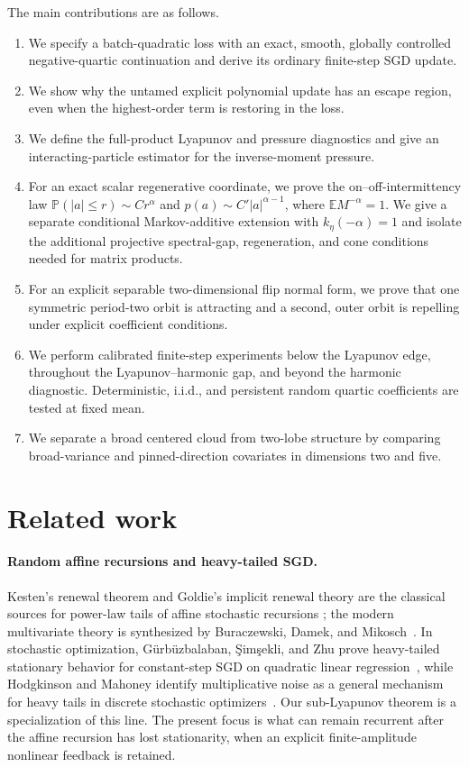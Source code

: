 \documentclass[11pt]{article}
\theoremstyle{definition}
\newcommand{\E}{\mathbb E}
\newcommand{\Pp}{\mathbb P}
\begin{document}
The main contributions are as follows.
\begin{enumerate}[label=\arabic*.,leftmargin=2em]
  \item We specify a batch-quadratic loss with an exact, smooth,
  globally controlled negative-quartic continuation and derive its ordinary
  finite-step SGD update.
  \item We show why the untamed explicit polynomial update has an escape
  region, even when the highest-order term is restoring in the loss.
  \item We define the full-product Lyapunov and pressure diagnostics and give
  an interacting-particle estimator for the inverse-moment pressure.
  \item For an exact scalar regenerative coordinate, we prove the
  on--off-intermittency law
  $\Pp(|a|\leq r)\sim C r^\alpha$ and
  $p(a)\sim C'|a|^{\alpha-1}$, where
  $\E M^{-\alpha}=1$.  We give a separate conditional Markov-additive
  extension with $k_\eta(-\alpha)=1$ and isolate the additional projective
  spectral-gap, regeneration, and cone conditions needed for matrix products.
  \item For an explicit separable two-dimensional flip normal form, we prove
  that one symmetric period-two orbit is attracting and a second, outer orbit
  is repelling under explicit coefficient conditions.
  \item We perform calibrated finite-step experiments below the Lyapunov edge,
  throughout the Lyapunov--harmonic gap, and beyond the harmonic diagnostic.
  Deterministic, i.i.d., and persistent random quartic coefficients are tested
  at fixed mean.
  \item We separate a broad centered cloud from two-lobe structure by comparing
  broad-variance and pinned-direction covariates in dimensions two and five.
\end{enumerate}

\section{Related work}

\paragraph{Random affine recursions and heavy-tailed SGD.}
Kesten's renewal theorem and Goldie's implicit renewal theory are the classical
sources for power-law tails of affine stochastic recursions
\cite{Kesten1973,Goldie1991}; the modern multivariate theory is synthesized by
Buraczewski, Damek, and Mikosch~\cite{BuraczewskiDamekMikosch2016}.  In
stochastic optimization, G\"urb\"uzbalaban, \c{S}im\c{s}ekli, and Zhu prove
heavy-tailed stationary behavior for constant-step SGD on quadratic linear
regression~\cite{GurbuzbalabanSimsekliZhu2021}, while Hodgkinson and Mahoney
identify multiplicative noise as a general mechanism for heavy tails in
discrete stochastic optimizers~\cite{HodgkinsonMahoney2021}.  Our
sub-Lyapunov theorem is a specialization of this line.  The present focus is
what can remain recurrent after the affine recursion has lost stationarity,
when an explicit finite-amplitude nonlinear feedback is retained.
\end{document}
